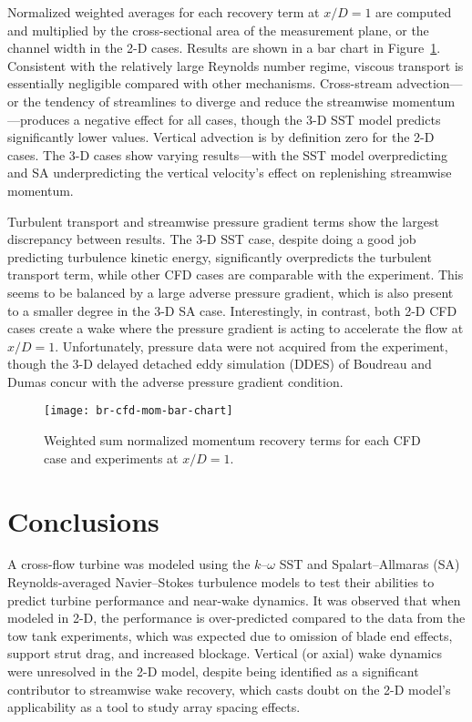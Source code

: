 Normalized weighted averages for each recovery term at $x/D=1$ are computed and
multiplied by the cross-sectional area of the measurement plane, or the channel
width in the 2-D cases. Results are shown in a bar chart in
Figure~\ref{fig:br-cfd-recovery}. Consistent with the relatively large Reynolds
number regime, viscous transport is essentially negligible compared with other
mechanisms. Cross-stream advection---or the tendency of streamlines to diverge
and reduce the streamwise momentum---produces a negative effect for all cases,
though the 3-D SST model predicts significantly lower values. Vertical advection
is by definition zero for the 2-D cases. The 3-D cases show varying
results---with the SST model overpredicting and SA underpredicting the vertical
velocity's effect on replenishing streamwise momentum.

Turbulent transport and streamwise pressure gradient terms show the largest
discrepancy between results. The 3-D SST case, despite doing a good job
predicting turbulence kinetic energy, significantly overpredicts the turbulent
transport term, while other CFD cases are comparable with the experiment. This
seems to be balanced by a large adverse pressure gradient, which is also present
to a smaller degree in the 3-D SA case. Interestingly, in contrast, both 2-D CFD
cases create a wake where the pressure gradient is acting to accelerate the flow
at $x/D=1$. Unfortunately, pressure data were not acquired from the experiment,
though the 3-D delayed detached eddy simulation (DDES) of Boudreau and Dumas
\cite{Boudreau2015} concur with the adverse pressure gradient condition.

\begin{figure}
    \centering

    \texttt{[image: br-cfd-mom-bar-chart]}

    \caption{Weighted sum normalized momentum recovery terms for each CFD case
        and experiments\cite{Bachant2016-RVAT-Re-dep} at $x/D=1$.}

    \label{fig:br-cfd-recovery}
\end{figure}


\section{Conclusions}

A cross-flow turbine was modeled using the $k$--$\omega$ SST and
Spalart--Allmaras (SA) Reynolds-averaged Navier--Stokes turbulence models to test
their abilities to predict turbine performance and near-wake dynamics. It was
observed that when modeled in 2-D, the performance is over-predicted compared to
the data from the tow tank experiments, which was expected due to omission of
blade end effects, support strut drag, and increased blockage. Vertical (or
axial) wake dynamics were unresolved in the 2-D model, despite being identified
as a significant contributor to streamwise wake recovery, which casts doubt on
the 2-D model's applicability as a tool to study array spacing effects.

